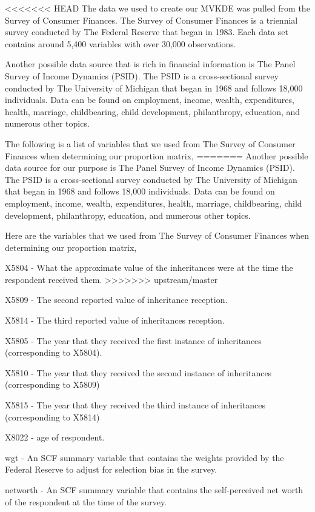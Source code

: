 \documentclass[letterpaper,12pt]{article}
\theoremstyle{definition}
\begin{document}
\begin{spacing}{1.5}
<<<<<<< HEAD
The data we used to create our MVKDE was pulled from the Survey of Consumer Finances. The Survey of Consumer Finances is a triennial survey conducted by The Federal Reserve that began in 1983. Each data set contains around 5,400 variables with over 30,000 observations. 

Another possible data source that is rich in financial information is The Panel Survey of Income Dynamics (PSID). The PSID is a cross-sectional survey conducted by The University of Michigan that began in 1968 and follows 18,000 individuals. Data can be found on employment, income, wealth, expenditures, health, marriage, childbearing, child development, philanthropy, education, and numerous other topics. \citet{UMich}

The following is a list of variables that we used from The Survey of Consumer Finances when determining our proportion matrix,
=======
  Another possible data source for our purpose is The Panel Survey of Income Dynamics (PSID). The PSID is a cross-sectional survey conducted by The University of Michigan that began in 1968 and follows 18,000 individuals. Data can be found on employment, income, wealth, expenditures, health, marriage, childbearing, child development, philanthropy, education, and numerous other topics. \citet{UMich}

  Here are the variables that we used from The Survey of Consumer Finances when determining our proportion matrix,

  X5804 - What the approximate value of the inheritances were at the time the respondent received them.
>>>>>>> upstream/master

  X5809 - The second reported value of inheritance reception.

  X5814 - The third reported value of inheritances reception.

  X5805 - The year that they received the first instance of inheritances (corresponding to X5804).

  X5810 - The year that they received the second instance of inheritances (corresponding to X5809)

  X5815 - The year that they received the third instance of inheritances (corresponding to X5814)

  X8022 - age of respondent.

  wgt - An SCF summary variable that contains the weights provided by the Federal Reserve to adjust for selection bias in the survey.

  networth - An SCF summary variable that contains the self-perceived net worth of the respondent at the time of the survey.



\end{spacing}
\end{document}
